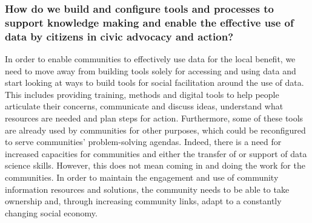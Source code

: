 \subsubsection{How do we build and configure tools and processes to support knowledge making and enable the effective use of data by citizens in civic advocacy and action?}
In order to enable communities to effectively use data for the local benefit, we need to move away from building tools solely for accessing and using data and start looking at ways to build tools for social facilitation around the use of data. This includes providing training, methods and digital tools to help people articulate their concerns, communicate and discuss ideas, understand what resources are needed and plan steps for action. Furthermore, some of these tools are already used by communities for other purposes, which could be reconfigured to serve communities' problem-solving agendas. Indeed, there is a need for increased capacities for communities and either the transfer of or support of data science skills. However, this does not mean coming in and doing the work for the communities. In order to maintain the engagement and use of community information resources and solutions, the community needs to be able to take ownership and, through increasing community links, adapt to a constantly changing social economy.